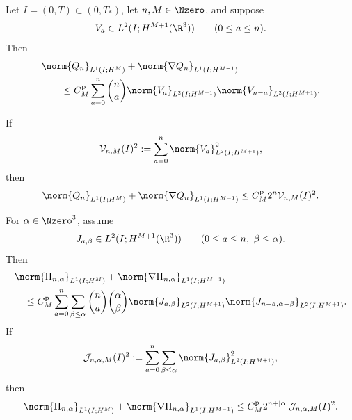 \begin{theorem}
\label{thm:formal-finite-row-pressure}
Let \(I=(0,T)\subset(0,T_*)\), let \(n,M\in\Nzero\), and suppose
\[
 V_a\in L^2(I;H^{M+1}(\R^3))
 \qquad(0\le a\le n).
\]
Then
\begin{align}
 &\norm{Q_n}_{L^1(I;H^M)}
 +\norm{\nabla Q_n}_{L^1(I;H^{M-1})}
 \notag\\
 &\qquad\le
 C_M^{\rm p}\sum_{a=0}^{n}\binom na
 \norm{V_a}_{L^2(I;H^{M+1})}
 \norm{V_{n-a}}_{L^2(I;H^{M+1})}.
 \label{eq:formal-finite-pressure-L1}
\end{align}
\begin{samepage}
If
\[
 \mathcal V_{n,M}(I)^2
 :=\sum_{a=0}^{n}
 \norm{V_a}_{L^2(I;H^{M+1})}^2,
\]
then
\begin{equation}
 \norm{Q_n}_{L^1(I;H^M)}
 +\norm{\nabla Q_n}_{L^1(I;H^{M-1})}
 \le C_M^{\rm p}2^n\mathcal V_{n,M}(I)^2.
 \label{eq:formal-finite-pressure-compressed}
\end{equation}
\end{samepage}
For \(\alpha\in\Nzero^3\), assume
\[
 J_{a,\beta}\in L^2(I;H^{M+1}(\R^3))
 \qquad
 (0\le a\le n,\ \beta\le\alpha).
\]
Then
\begin{align}
 &\norm{\Pi_{n,\alpha}}_{L^1(I;H^M)}
 +\norm{\nabla\Pi_{n,\alpha}}_{L^1(I;H^{M-1})}
 \notag\\
 &\quad\le
 C_M^{\rm p}
 \sum_{a=0}^{n}\sum_{\beta\le\alpha}
 \binom na\binom{\alpha}{\beta}
 \norm{J_{a,\beta}}_{L^2(I;H^{M+1})}
 \norm{J_{n-a,\alpha-\beta}}_{L^2(I;H^{M+1})}.
 \label{eq:formal-finite-mixed-pressure-L1}
\end{align}
If
\[
 \mathcal J_{n,\alpha,M}(I)^2
 :=
 \sum_{a=0}^{n}\sum_{\beta\le\alpha}
 \norm{J_{a,\beta}}_{L^2(I;H^{M+1})}^2,
\]
then
\begin{equation}
 \norm{\Pi_{n,\alpha}}_{L^1(I;H^M)}
 +\norm{\nabla\Pi_{n,\alpha}}_{L^1(I;H^{M-1})}
 \le
 C_M^{\rm p}2^{n+|\alpha|}
 \mathcal J_{n,\alpha,M}(I)^2.
 \label{eq:formal-finite-mixed-pressure-compressed}
\end{equation}
\end{theorem}

